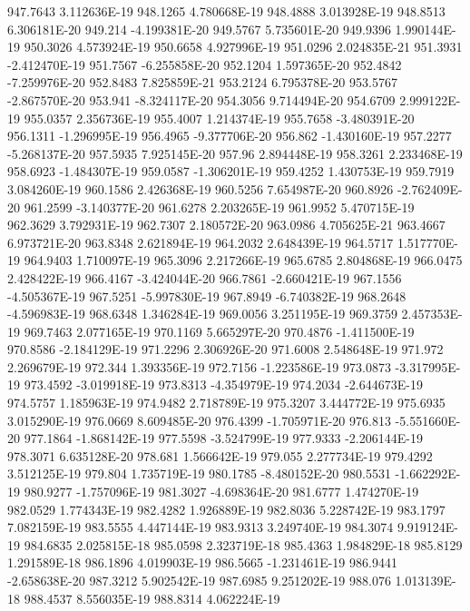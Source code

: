 947.7643  3.112636E-19
948.1265  4.780668E-19
948.4888  3.013928E-19
948.8513  6.306181E-20
949.214  -4.199381E-20
949.5767  5.735601E-20
949.9396  1.990144E-19
950.3026  4.573924E-19
950.6658  4.927996E-19
951.0296  2.024835E-21
951.3931  -2.412470E-19
951.7567  -6.255858E-20
952.1204  1.597365E-20
952.4842  -7.259976E-20
952.8483  7.825859E-21
953.2124  6.795378E-20
953.5767  -2.867570E-20
953.941  -8.324117E-20
954.3056  9.714494E-20
954.6709  2.999122E-19
955.0357  2.356736E-19
955.4007  1.214374E-19
955.7658  -3.480391E-20
956.1311  -1.296995E-19
956.4965  -9.377706E-20
956.862  -1.430160E-19
957.2277  -5.268137E-20
957.5935  7.925145E-20
957.96  2.894448E-19
958.3261  2.233468E-19
958.6923  -1.484307E-19
959.0587  -1.306201E-19
959.4252  1.430753E-19
959.7919  3.084260E-19
960.1586  2.426368E-19
960.5256  7.654987E-20
960.8926  -2.762409E-20
961.2599  -3.140377E-20
961.6278  2.203265E-19
961.9952  5.470715E-19
962.3629  3.792931E-19
962.7307  2.180572E-20
963.0986  4.705625E-21
963.4667  6.973721E-20
963.8348  2.621894E-19
964.2032  2.648439E-19
964.5717  1.517770E-19
964.9403  1.710097E-19
965.3096  2.217266E-19
965.6785  2.804868E-19
966.0475  2.428422E-19
966.4167  -3.424044E-20
966.7861  -2.660421E-19
967.1556  -4.505367E-19
967.5251  -5.997830E-19
967.8949  -6.740382E-19
968.2648  -4.596983E-19
968.6348  1.346284E-19
969.0056  3.251195E-19
969.3759  2.457353E-19
969.7463  2.077165E-19
970.1169  5.665297E-20
970.4876  -1.411500E-19
970.8586  -2.184129E-19
971.2296  2.306926E-20
971.6008  2.548648E-19
971.972  2.269679E-19
972.344  1.393356E-19
972.7156  -1.223586E-19
973.0873  -3.317995E-19
973.4592  -3.019918E-19
973.8313  -4.354979E-19
974.2034  -2.644673E-19
974.5757  1.185963E-19
974.9482  2.718789E-19
975.3207  3.444772E-19
975.6935  3.015290E-19
976.0669  8.609485E-20
976.4399  -1.705971E-20
976.813  -5.551660E-20
977.1864  -1.868142E-19
977.5598  -3.524799E-19
977.9333  -2.206144E-19
978.3071  6.635128E-20
978.681  1.566642E-19
979.055  2.277734E-19
979.4292  3.512125E-19
979.804  1.735719E-19
980.1785  -8.480152E-20
980.5531  -1.662292E-19
980.9277  -1.757096E-19
981.3027  -4.698364E-20
981.6777  1.474270E-19
982.0529  1.774343E-19
982.4282  1.926889E-19
982.8036  5.228742E-19
983.1797  7.082159E-19
983.5555  4.447144E-19
983.9313  3.249740E-19
984.3074  9.919124E-19
984.6835  2.025815E-18
985.0598  2.323719E-18
985.4363  1.984829E-18
985.8129  1.291589E-18
986.1896  4.019903E-19
986.5665  -1.231461E-19
986.9441  -2.658638E-20
987.3212  5.902542E-19
987.6985  9.251202E-19
988.076  1.013139E-18
988.4537  8.556035E-19
988.8314  4.062224E-19
